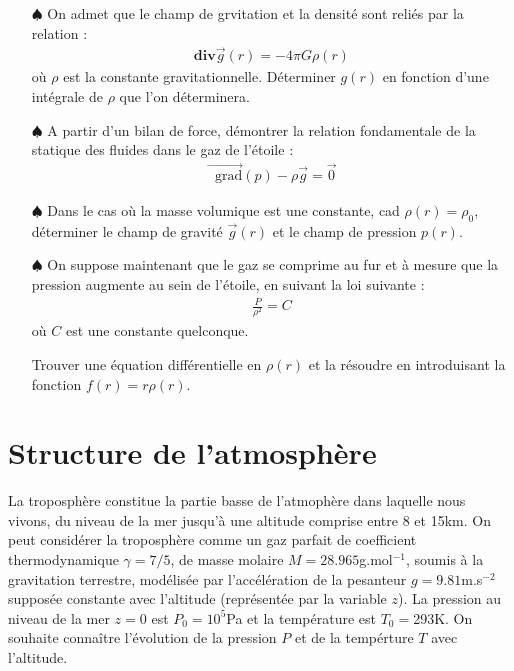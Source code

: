 \documentclass{report}
\newcommand*\grad{\mathop{}\!\mathrm{grad}}
\begin{document}
\begin{itemize}

	\item[$\spadesuit$] On admet que le champ de grvitation et la densité sont reliés par la relation :
	\begin{align*}
		\mathbf{div}\vec{g}(r)=-4\pi G\rho(r)
	\end{align*}
où $\rho$ est la constante gravitationnelle. 
Déterminer $g(r)$ en fonction d'une intégrale de $\rho$ que l'on déterminera.

	\item[$\spadesuit$] A partir d'un bilan de force, démontrer la relation fondamentale de la statique des fluides dans le gaz de l'étoile : 
	\begin{align*}
		\vec{\grad}(p) - \rho\vec{g}=\vec{0}
	\end{align*}
	
	\item[$\spadesuit$] Dans le cas où la masse volumique est une constante, cad $\rho(r)=\rho_0$, déterminer le champ de gravité $\vec{g}(r)$ et le champ de pression $p(r)$.
	
	\item[$\spadesuit$] On suppose maintenant que le gaz se comprime au fur et à mesure que la pression augmente au sein de l'étoile, en suivant la loi suivante : 
	\begin{align*}
		\frac{P}{\rho^2}= C
	\end{align*}
	où $C$ est une constante quelconque. 
	
	Trouver une équation différentielle en $\rho(r)$ et la résoudre en introduisant la fonction $f(r)=r\rho(r)$.

\end{itemize}

\newpage

\section*{Structure de l'atmosphère}

La troposphère constitue la partie basse de l'atmophère dans laquelle nous vivons, du niveau de la mer jusqu'à une altitude comprise entre 8 et 15km. On peut considérer la troposphère comme un gaz parfait de coefficient thermodynamique $\gamma=7/5$, de masse molaire $M=28.965$g.mol$^{-1}$, soumis à la gravitation terrestre, modélisée par l'accélération de la pesanteur $g=9.81$m.s$^{-2}$ supposée constante avec l'altitude (représentée par la variable $z$). La pression au niveau de la mer $z=0$ est $P_0=10^5$Pa et la température est $T_0=$293K. On souhaite connaître l'évolution de la pression $P$ et de la tempérture $T$ avec l'altitude.
\end{document}
